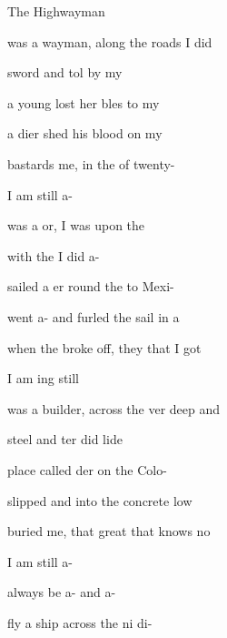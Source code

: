 \begin{SBSong}{The Highwayman}{}{}
  \begin{SBVerse}
     was a wayman, along the  roads I did 

     sword and tol by my 

     a young  lost her bles to my 

     a dier shed his blood on my 

     bastards  me, in the  of twenty-

     I am still a-
  \end{SBVerse}
  \begin{SBVerse}
     was a or, I was  upon the 

     with the  I did a-

     sailed a er round the  to Mexi-

     went a- and furled the sail in a 

     when the  broke off, they  that I got 

     I am ing still
  \end{SBVerse}
  \begin{SBVerse}
     was a  builder, across the ver deep and 

     steel and ter did lide

     place called der on the  Colo-

     slipped and  into the  concrete low

     buried me,  that great  that knows no 

     I am still a-

     always be a- and a-   
  \end{SBVerse}
  \begin{SBVerse}
     fly a ship across the ni di-


\end{SBVerse}
\end{SBSong}
